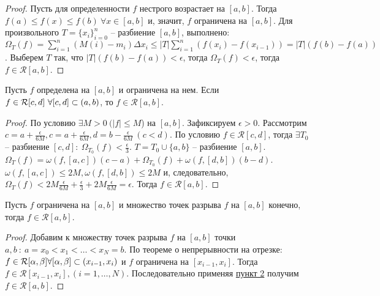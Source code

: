     \begin{proof}
        Пусть для определенности $f$ нестрого возрастает на $[a, b]$. Тогда $f(a) \leq f(x) \leq f(b) \ \forall x \in [a, b]$ и, значит, $f$ ограничена на $[a, b]$. Для произвольного $T = \{x_i\}_{i = 0}^n$ -- разбиение $[a, b]$, выполнено:
        $\Omega_T (f) = \sum_{i = 1}^n(M(i) - m_{i})\Delta x_i \leq |T|\sum_{i = 1}^n(f(x_i) - f(x_{i-1}))
        = |T|(f(b) - f(a))$.
        Выберем $T$ так, что $|T| (f(b) - f(a)) < \epsilon$, тогда $\Omega_T(f) < \epsilon$, тогда
        $f \in \mathcal{R}[a, b]$.
    \end{proof}
    
    \begin{theorem}
        Пусть $f$ определена на $[a, b]$ и ограничена на нем.
        Если $f \in \mathcal{R}[c, d] \ \forall [c, d] \subset (a, b)$, то $f \in \mathcal{R}[a, b]$.
    \end{theorem}
    
    \begin{proof}
        По условию $\exists M > 0 \ (|f| \leq M $) на $[a, b]$.
        Зафиксируем $\epsilon > 0$. Рассмотрим $c = a + \frac{\epsilon}{6M},
        c = a + \frac{\epsilon}{6M}, d = b - \frac{\epsilon}{6M} \ (c < d)$.
        По условию $f \in \mathcal{R}[c, d]$, тогда $\exists T_0$ -- разбиение
        $[c, d] : \ \Omega_{T_0}(f) < \frac{\epsilon}{3}$.
        $T = T_0 \cup \{a, b\}$ -- разбиение $[a, b]$.
        $\Omega_T(f) = \omega(f, [a, c])(c - a) + \Omega_{T_0}(f) + \omega(f, [d, b])(b - d)$.
        $\omega(f, [a, c]) \leq 2M, \omega(f, [d, b]) \leq 2M$ и, следовательно,
        $\Omega_T(f) < 2M \frac{\epsilon}{6M} + \frac{\epsilon}{3} + 2M \frac{\epsilon}{6M} = \epsilon$.
        Тогда $f \in \mathcal{R}[a, b]$.
    \end{proof}

    \begin{corollary}
        Пусть $f$ ограничена на $[a, b]$ и множество точек разрыва $f$ на $[a, b]$ конечно,
        тогда $f \in \mathcal{R}[a, b]$.
    \end{corollary}
    
    \begin{proof}
        Добавим к множеству точек разрыва $f$ на $[a, b]$ точки
        $a, b \ : \ a = x_0 < x_1 < \dots < x_N = b$.
        По теореме о непрерывности на отрезке: $f \in \mathcal{R}[\alpha, \beta] \forall [\alpha, \beta] \subset (x_{i-1}, x_i)$
        и $f$ ограничена на $[x_{i-1}, x_{i}]$. Тогда $f \in \mathcal{R}[x_{i-1}, x_{i}],
        (i = 1, \dots, N)$. Последовательно применяя \hyperlink{punkt_2}{пункт 2} получим $f \in \mathcal{R}[a, b]$.
    \end{proof}

